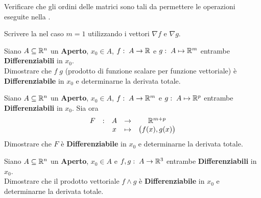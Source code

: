 \begin{exercise}
	Verificare che gli ordini delle matrici sono tali da permettere le operazioni eseguite nella .
\end{exercise}
\begin{exercise}
	Scrivere la  nel caso $m = 1$ utilizzando i vettori $\nabla f$ e $\nabla g$.
\end{exercise}
\begin{exercise}
	Siano $A \subseteq \mathbb{R}^n$ un \textbf{Aperto}, $x_0 \in A$, $f:\; A \to \mathbb{R}$ e $g:\; A \mapsto \mathbb{R}^m$ entrambe \textbf{Differenziabili} in $x_0$.\\
	Dimostrare che $f \; g$ (prodotto di funzione scalare per funzione vettoriale) è \textbf{Differenziabile} in $x_0$ e determinarne la derivata totale.
\end{exercise}
\begin{exercise}
	Siano $A \subseteq \mathbb{R}^n$ un \textbf{Aperto}, $x_0 \in A$, $f:\; A \to \mathbb{R}^m$ e $g:\; A \mapsto \mathbb{R}^p$ entrambe \textbf{Differenziabili} in $x_0$. Sia ora
	\[
		\begin{array}{ccccc} {
			F
		} & : & {
			A
		} & \to & {
			\mathbb{R}^{m + p}
		} \\ & & {
			x
		} & \mapsto & {
			\bigl( f(x), g(x) \bigr)
		} \\ \end{array}
	\]
	Dimostrare che $F$ è \textbf{Differenziabile} in $x_0$ e determinarne la derivata totale.
\end{exercise}
\begin{exercise}
	Siano $A \subseteq \mathbb{R}^n$ un \textbf{Aperto}, $x_0 \in A$ e $f,g:\; A \to \mathbb{R}^3$ entrambe \textbf{Differenziabili} in $x_0$.\\
	Dimostrare che il prodotto vettoriale $f \wedge g$ è \textbf{Differenziabile} in $x_0$ e determinarne la derivata totale.
\end{exercise}

